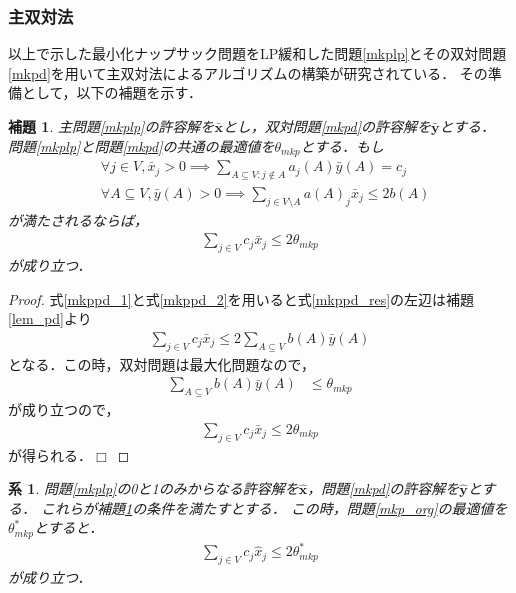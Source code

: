 \documentclass[11pt,dvipdfmx]{jarticle}
\def\qed{\hfill $\Box$}
\numberwithin{equation}{section}
\newtheorem{lem}{補題}[section]
\newtheorem{proof}{証明}
\newtheorem{coro}{系}[section]
\begin{document}
        \subsubsection{主双対法}
            以上で示した最小化ナップサック問題をLP緩和した問題\eqref{mkplp}とその双対問題\eqref{mkpd}を用いて主双対法によるアルゴリズムの構築が研究されている\cite{apx_des}．
            その準備として，以下の補題を示す．
            \begin{lem}
                主問題\eqref{mkplp}の許容解を$\bar{\bm{x}}$とし，双対問題\eqref{mkpd}の許容解を$\bar{\bm{y}}$とする．
                問題\eqref{mkplp}と問題\eqref{mkpd}の共通の最適値を$\theta_{mkp}$とする．もし
                \begin{subequations}
                    \begin{align}
                        &\forall j\in V,\bar{x}_j>0 \implies \sum_{A\subseteq V:j\notin A}{a_j(A)\bar{y}(A)} = c_j \label{mkppd_1}\\
                        &\forall A\subseteq V,\bar{y}(A)>0 \implies \sum_{j\in V\setminus A}{a(A)_j\bar{x}_j}\le 2b(A) \label{mkppd_2}
                    \end{align}
                \end{subequations}
                が満たされるならば，
                \begin{align}
                    \sum_{j\in V}{c_j\bar{x}_j} \le 2\theta_{mkp} \label{mkppd_res}
                \end{align}
                が成り立つ．
                \label{lem1}
            \end{lem}
            \begin{proof}
                式\eqref{mkppd_1}と式\eqref{mkppd_2}を用いると式\eqref{mkppd_res}の左辺は補題\rm\ref{lem_pd}より
                \begin{align}
                    \sum_{j\in V}{c_j\bar{x}_j} \le 2\sum_{A\subseteq V}{b(A)\bar{y}(A)}
                \end{align}  
                となる．この時，双対問題は最大化問題なので，
                \begin{align}
                    \sum_{A\subseteq V}{b(A)\bar{y}(A)} &\le \theta_{mkp}
                \end{align}
                が成り立つので，
                \begin{align}
                    \sum_{j\in V}{c_j\bar{x}_j} \le 2\theta_{mkp}
                \end{align}
                が得られる．\qed
            \end{proof}
            \begin{coro}
                問題\eqref{mkplp}の\rm0と1のみからなる許容解を$\hat{\bm{x}}$，問題\eqref{mkpd}の許容解を$\hat{\bm{y}}$とする．
                これらが補題\ref{lem1}の条件を満たすとする．
                この時，問題\eqref{mkp_org}の最適値を$\theta^*_{mkp}$とすると．
                \begin{align}
                    \sum_{j\in V}{c_j\hat{x}_j}\le2\theta^*_{mkp}
                \end{align}
                が成り立つ．
                \label{coro1}
            \end{coro}
        
\end{document}
